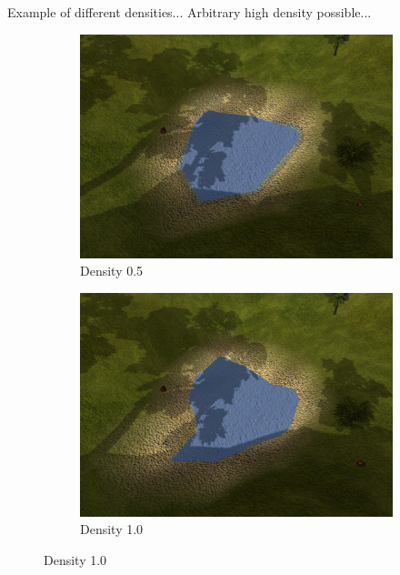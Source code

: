 Example of different densities... Arbitrary high density possible...
\begin{figure}[H]
\begin{subfigure}{.5\textwidth}
  \centering
  \includegraphics[width=0.9\linewidth]{images/terrainDensityComparison1_05.jpg}
  \caption{Density 0.5}
  \label{fig:textureDensity05}
\end{subfigure}%
\begin{subfigure}{.5\textwidth}
  \centering
  \includegraphics[width=0.9\linewidth]{images/terrainDensityComparison1_1.jpg}
  \caption{Density 1.0}
  \label{fig:textureDensity1}
\end{subfigure}%


\end{figure}

